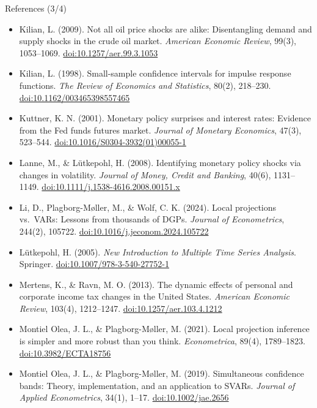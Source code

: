 \begin{frame}{References (3/4)}
\itemsize{\tiny}
\begin{itemize}
    \item Kilian, L. (2009). Not all oil price shocks are alike: Disentangling demand and supply shocks in the crude oil market. \textit{American Economic Review}, 99(3), 1053--1069. \href{https://doi.org/10.1257/aer.99.3.1053}{doi:10.1257/aer.99.3.1053}
    \item Kilian, L. (1998). Small-sample confidence intervals for impulse response functions. \textit{The Review of Economics and Statistics}, 80(2), 218--230. \href{https://doi.org/10.1162/003465398557465}{doi:10.1162/003465398557465}
    \item Kuttner, K. N. (2001). Monetary policy surprises and interest rates: Evidence from the Fed funds futures market. \textit{Journal of Monetary Economics}, 47(3), 523--544. \href{https://doi.org/10.1016/S0304-3932(01)00055-1}{doi:10.1016/S0304-3932(01)00055-1}
    \item Lanne, M., \& Lütkepohl, H. (2008). Identifying monetary policy shocks via changes in volatility. \textit{Journal of Money, Credit and Banking}, 40(6), 1131--1149. \href{https://doi.org/10.1111/j.1538-4616.2008.00151.x}{doi:10.1111/j.1538-4616.2008.00151.x}
    \item Li, D., Plagborg-Møller, M., \& Wolf, C. K. (2024). Local projections vs.\ VARs: Lessons from thousands of DGPs. \textit{Journal of Econometrics}, 244(2), 105722. \href{https://doi.org/10.1016/j.jeconom.2024.105722}{doi:10.1016/j.jeconom.2024.105722}
    \item Lütkepohl, H. (2005). \textit{New Introduction to Multiple Time Series Analysis}. Springer. \href{https://doi.org/10.1007/978-3-540-27752-1}{doi:10.1007/978-3-540-27752-1}
    \item Mertens, K., \& Ravn, M. O. (2013). The dynamic effects of personal and corporate income tax changes in the United States. \textit{American Economic Review}, 103(4), 1212--1247. \href{https://doi.org/10.1257/aer.103.4.1212}{doi:10.1257/aer.103.4.1212}
    \item Montiel Olea, J. L., \& Plagborg-Møller, M. (2021). Local projection inference is simpler and more robust than you think. \textit{Econometrica}, 89(4), 1789--1823. \href{https://doi.org/10.3982/ECTA18756}{doi:10.3982/ECTA18756}
    \item Montiel Olea, J. L., \& Plagborg-Møller, M. (2019). Simultaneous confidence bands: Theory, implementation, and an application to SVARs. \textit{Journal of Applied Econometrics}, 34(1), 1--17. \href{https://doi.org/10.1002/jae.2656}{doi:10.1002/jae.2656}

\end{itemize}
\end{frame}

